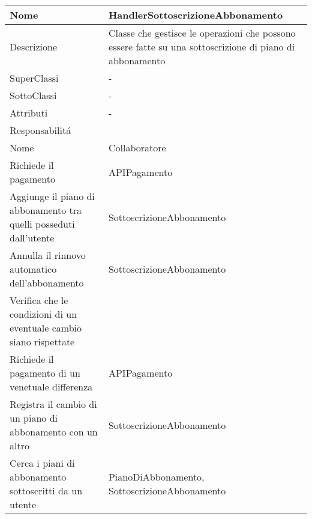 \begin{center}
    \begin{longtable}{ |p{3cm}|p{3cm}|p{3cm}|p{3cm}| }
        \hline
        Nome & \multicolumn{3}{|p{9cm}|}{HandlerSottoscrizioneAbbonamento} \\\hline
        Descrizione & \multicolumn{3}{|p{9cm}|}{Classe che gestisce le operazioni che possono essere fatte su una sottoscrizione di piano di abbonamento} \\\hline
        SuperClassi & \multicolumn{3}{|p{9cm}|}{-} \\\hline
        SottoClassi & \multicolumn{3}{|p{9cm}|}{-} \\\hline
        Attributi & \multicolumn{3}{|p{9cm}|}{-} \\\hline
        \multicolumn{4}{|p{12cm}|}{Responsabilit\'a} \\\hline
        \multicolumn{2}{|p{6cm}|}{Nome} & \multicolumn{2}{|p{6cm}|}{Collaboratore} \\\hline
        \multicolumn{2}{|p{6cm}|}{Richiede il pagamento} & \multicolumn{2}{|p{6cm}|}{APIPagamento} \\\hline
        \multicolumn{2}{|p{6cm}|}{Aggiunge il piano di abbonamento tra quelli posseduti dall'utente} & \multicolumn{2}{|p{6cm}|}{SottoscrizioneAbbonamento} \\\hline
        \multicolumn{2}{|p{6cm}|}{Annulla il rinnovo automatico dell'abbonamento} & \multicolumn{2}{|p{6cm}|}{SottoscrizioneAbbonamento} \\\hline
        \multicolumn{2}{|p{6cm}|}{Verifica che le condizioni di un eventuale cambio siano rispettate} & \multicolumn{2}{|p{6cm}|}{} \\\hline
        \multicolumn{2}{|p{6cm}|}{Richiede il pagamento di un venetuale differenza} & \multicolumn{2}{|p{6cm}|}{APIPagamento} \\\hline
        \multicolumn{2}{|p{6cm}|}{Registra il cambio di un piano di abbonamento con un altro} & \multicolumn{2}{|p{6cm}|}{SottoscrizioneAbbonamento} \\\hline
        \multicolumn{2}{|p{6cm}|}{Cerca i piani di abbonamento sottoscritti da un utente} & \multicolumn{2}{|p{6cm}|}{PianoDiAbbonamento, SottoscrizioneAbbonamento} \\\hline
    \end{longtable}
\end{center}

